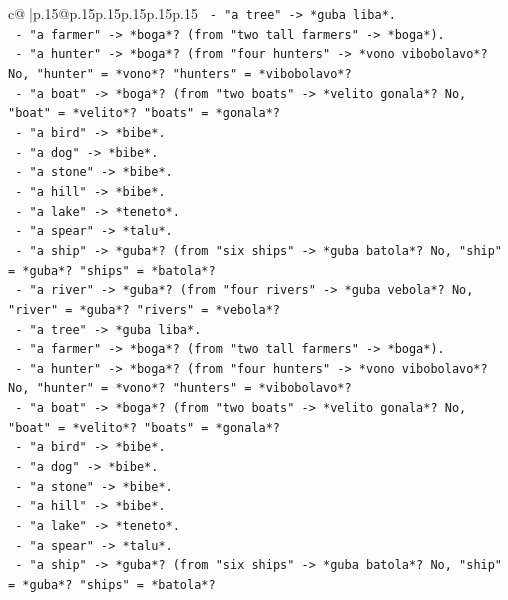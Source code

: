 \documentclass{article}
\begin{document}
{\begin{supertabular}{c@{$\;$}|p{.15\linewidth}@{}p{.15\linewidth}p{.15\linewidth}p{.15\linewidth}p{.15\linewidth}p{.15\linewidth}}
{{{\texttt{      {-} "a tree" {-}> *guba liba*.} \\
\texttt{      {-} "a farmer" {-}> *boga*? (from "two tall farmers" {-}> *boga*).} \\
\texttt{      {-} "a hunter" {-}> *boga*? (from "four hunters" {-}> *vono vibobolavo*? No, "hunter" = *vono*? "hunters" = *vibobolavo*?} \\
\texttt{      {-} "a boat" {-}> *boga*? (from "two boats" {-}> *velito gonala*? No, "boat" = *velito*? "boats" = *gonala*?} \\
\texttt{      {-} "a bird" {-}> *bibe*.} \\
\texttt{      {-} "a dog" {-}> *bibe*.} \\
\texttt{      {-} "a stone" {-}> *bibe*.} \\
\texttt{      {-} "a hill" {-}> *bibe*.} \\
\texttt{      {-} "a lake" {-}> *teneto*.} \\
\texttt{      {-} "a spear" {-}> *talu*.} \\
\texttt{      {-} "a ship" {-}> *guba*? (from "six ships" {-}> *guba batola*? No, "ship" = *guba*? "ships" = *batola*?} \\
\texttt{      {-} "a river" {-}> *guba*? (from "four rivers" {-}> *guba vebola*? No, "river" = *guba*? "rivers" = *vebola*?} \\
\texttt{      {-} "a tree" {-}> *guba liba*.} \\
\texttt{      {-} "a farmer" {-}> *boga*? (from "two tall farmers" {-}> *boga*).} \\
\texttt{      {-} "a hunter" {-}> *boga*? (from "four hunters" {-}> *vono vibobolavo*? No, "hunter" = *vono*? "hunters" = *vibobolavo*?} \\
\texttt{      {-} "a boat" {-}> *boga*? (from "two boats" {-}> *velito gonala*? No, "boat" = *velito*? "boats" = *gonala*?} \\
\texttt{      {-} "a bird" {-}> *bibe*.} \\
\texttt{      {-} "a dog" {-}> *bibe*.} \\
\texttt{      {-} "a stone" {-}> *bibe*.} \\
\texttt{      {-} "a hill" {-}> *bibe*.} \\
\texttt{      {-} "a lake" {-}> *teneto*.} \\
\texttt{      {-} "a spear" {-}> *talu*.} \\
\texttt{      {-} "a ship" {-}> *guba*? (from "six ships" {-}> *guba batola*? No, "ship" = *guba*? "ships" = *batola*?} \\
}}}
\end{supertabular}}
\end{document}
